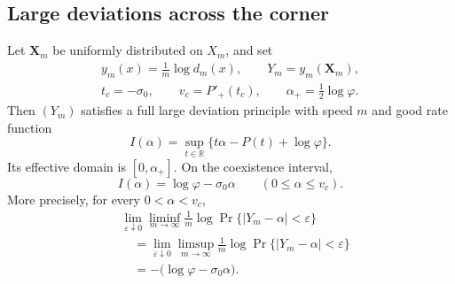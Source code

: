 \ifdefined\supplementonly
\else
\subsection{Large deviations across the corner}

\begin{theorem}
\label{thm:full-fiber-ldp}
Let \(\mathbf X_m\) be uniformly distributed on \(X_m\), and set
\[
 \begin{gathered}
 y_m(x)=\frac1m\log d_m(x),\qquad Y_m=y_m(\mathbf X_m),\\
 t_c=-\sigma_0,\qquad v_c=P'_+(t_c),
 \qquad \alpha_+=\frac12\log\varphi.
 \end{gathered}
\]
Then \((Y_m)\) satisfies a full large deviation principle with speed \(m\)
and good rate function
\begin{equation}
 I(\alpha)=\sup_{t\in\mathbb R}
 \{t\alpha-P(t)+\log\varphi\}.
 \label{eq:full-fiber-ldp-rate}
\end{equation}
Its effective domain is \([0,\alpha_+]\).  On the coexistence interval,
\begin{equation}
 I(\alpha)=\log\varphi-\sigma_0\alpha
 \qquad(0\le\alpha\le v_c).
 \label{eq:frozen-affine-rate}
\end{equation}
More precisely, for every \(0<\alpha<v_c\),
\begin{equation}
 \begin{aligned}
 &\lim_{\varepsilon\downarrow0}\liminf_{m\to\infty}
 \frac1m\log\Pr\{|Y_m-\alpha|<\varepsilon\}\\
 &\quad=\lim_{\varepsilon\downarrow0}\limsup_{m\to\infty}
 \frac1m\log\Pr\{|Y_m-\alpha|<\varepsilon\}\\
 &\quad=-\bigl(\log\varphi-\sigma_0\alpha\bigr).
 \end{aligned}
 \label{eq:frozen-local-large-deviation}
\end{equation}
\end{theorem}

